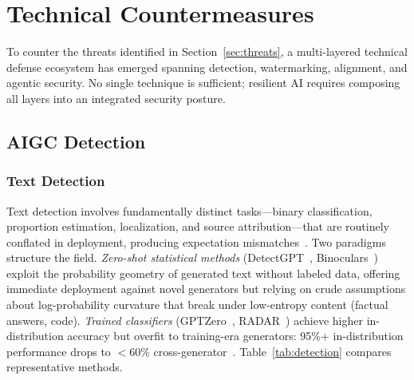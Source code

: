 
\section{Technical Countermeasures}
\label{sec:countermeasures}

To counter the threats identified in Section~\ref{sec:threats}, a multi-layered technical defense ecosystem has emerged spanning detection, watermarking, alignment, and agentic security. No single technique is sufficient; resilient AI requires composing all layers into an integrated security posture.


\subsection{AIGC Detection}
\label{sec:detect}

\subsubsection{Text Detection}
\label{sec:detect-text}

Text detection involves fundamentally distinct tasks---binary classification, proportion estimation, localization, and source attribution---that are routinely conflated in deployment, producing expectation mismatches~\cite{dugan2024raid}. Two paradigms structure the field. \emph{Zero-shot statistical methods} (DetectGPT~\cite{mitchell2023detectgpt}, Binoculars~\cite{hans2024binoculars}) exploit the probability geometry of generated text without labeled data, offering immediate deployment against novel generators but relying on crude assumptions about log-probability curvature that break under low-entropy content (factual answers, code). \emph{Trained classifiers} (GPTZero~\cite{adam2026gptzero}, RADAR~\cite{hu2023radar}) achieve higher in-distribution accuracy but overfit to training-era generators: 95\%+ in-distribution performance drops to $<$60\% cross-generator~\cite{macko2023multitude}. Table~\ref{tab:detection} compares representative methods.

